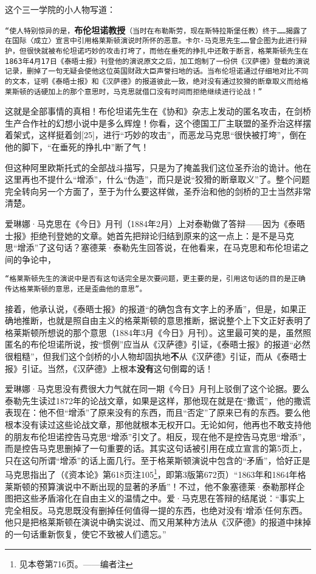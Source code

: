 \documentclass{ctexbook}
\begin{document}
这个三一学院的小人物写道：

\texttt{“使人特别惊异的是，}\textbf{布伦坦诺教授}\texttt{（当时在布勒斯劳，现在斯特拉斯堡任教）终于……揭露了在国际〈成立〉宣言中引用格莱斯顿演说时所怀的恶意。卡尔·马克思先生……曾企图为此进行辩护，但很快就被布伦坦诺巧妙的攻击打垮了，而他在垂死的挣扎中还敢于断言，格莱斯顿先生在1863年4月17日《泰晤士报》刊登他的演说原文之后，加工炮制了一份供《汉萨德》登载的演说记录，删掉了一句无疑会使他这位英国财政大臣声誉扫地的话。当布伦坦诺通过仔细地对比不同的文本，证明《泰晤士报》和《汉萨德》的报道彼此一致，绝对没有通过狡猾的断章取义而给格莱斯顿的话硬加上的那个意思时，马克思就借口没有时间而拒绝继续进行论战！”}

这就是全部事情的真相！布伦坦诺先生在《协和》杂志上发动的匿名攻击，在剑桥生产合作社的幻想小说中是多么辉煌！你看，这个德国工厂主联盟的圣乔治这样摆着架式，这样挺着剑[25]，进行“巧妙的攻击”，而恶龙马克思“很快被打垮”，倒在他的脚下，“在垂死的挣扎中”断了气！

但这种阿里欧斯托式的全部战斗描写，只是为了掩盖我们这位圣乔治的诡计。他在这里再也不提什么“增添”，什么“伪造”，而只是说“狡猾的断章取义”了。整个问题完全转向另一个方面了，至于为什么要这样做，圣乔治和他的剑桥的卫士当然非常清楚。

爱琳娜·马克思在《今日》月刊（1884年2月）上对泰勒做了答辩——因为《泰晤士报》拒绝刊登她的文章。她首先把辩论归结到原来的这一点上：是不是马克思“增添”了这句话？塞德莱·泰勒先生回答说，在他看来，在马克思和布伦坦诺之间的争论中，

\texttt{“格莱斯顿先生的演说中是否有这句话完全是次要问题，更主要的是，引用这句话的目的是正确传达格莱斯顿的意思，还是歪曲他的意思”。}

接着，他承认说，《泰晤士报》的报道“的确包含有文字上的矛盾”，但是，如果正确地推断，也就是照自由主义的格莱斯顿的意思推断，据说整个上下文正好表明了格莱斯顿所想说的那个意思（1884年3月《今日》月刊）。这里最可笑的是，虽然照匿名的布伦坦诺所说，按“惯例”应当从《汉萨德》引证，《泰晤士报》的报道“必然很粗糙”，但我们这个剑桥的小人物却固执地\textbf{不}从《汉萨德》引证，而从《泰晤士报》引证。当然，《汉萨德》上根本\textbf{没有}这句倒霉的话！

爱琳娜·马克思没有费很大力气就在同一期《今日》月刊上驳倒了这个论据。要么泰勒先生读过1872年的论战文章，如果是这样，那他现在就是在“撒谎”，他的撒谎表现在：他不但“增添”了原来没有的东西，而且“否定”了原来已有的东西。要么他根本没有读过这些论战文章，那他就根本无权开口。无论如何，他再也不敢支持他的朋友布伦坦诺控告马克思“增添”引文了。相反，现在他不是控告马克思“增添”，而是控告马克思删掉了一句重要的话。其实这句话被引用在成立宣言的第5页上，只在这句所谓“增添”的话上面几行。至于格莱斯顿演说中包含的“矛盾”，恰好正是马克思指出了（《资本论》第618页注105\footnote{见本卷第716页。——编者注}，即第3版第672页）“1863年和1864年格莱斯顿的预算演说中不断出现的显著的矛盾”！不过，他不象塞德莱·泰勒那样企图把这些矛盾溶化在自由主义的温情之中。爱·马克思在答辩的结尾说：“事实上完全相反。马克思既没有删掉任何值得一提的东西，也绝对没有‘增添’任何东西。他只是把格莱斯顿在演说中确实说过、而又用某种方法从《汉萨德》的报道中抹掉的一句话重新恢复，使它不致被人们遗忘。”
\end{document}
